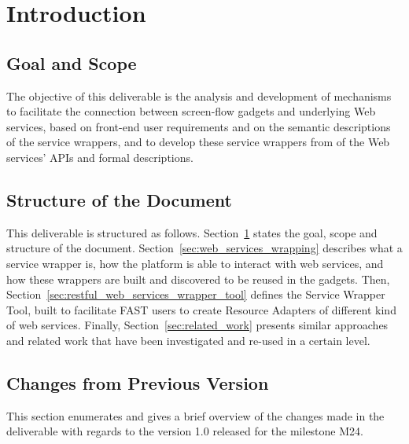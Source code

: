 \documentclass{fast_latex}
\begin{document}
\section{Introduction} %
\label{sec:introduction}

\subsection{Goal and Scope} %
\label{sub:goal_and_scope}

The objective of this deliverable is the analysis and development of mechanisms to facilitate the connection between screen-flow gadgets and underlying Web services, based on front-end user requirements and on the semantic descriptions of the service wrappers, and to develop these service wrappers from of the Web services' APIs and formal descriptions.


\subsection{Structure of the Document} %
\label{sub:structure_of_the_document}

This deliverable is structured as follows. Section~\ref{sec:introduction} states the goal, scope and structure of the document. Section~\ref{sec:web_services_wrapping} describes what a service wrapper is, how the platform is able to interact with web services, and how these wrappers are built and discovered to be reused in the gadgets. Then, Section~\ref{sec:restful_web_services_wrapper_tool} defines the Service Wrapper Tool, built to facilitate FAST users to create Resource Adapters of different kind of web services. Finally, Section~\ref{sec:related_work} presents similar approaches and related work that have been investigated and re-used in a certain level.



\subsection{Changes from Previous Version} %
\label{sub:changes_from_previous_version}

This section enumerates and gives a brief overview of the changes made in the deliverable with regards to the version 1.0 released for the milestone M24.
\end{document}
